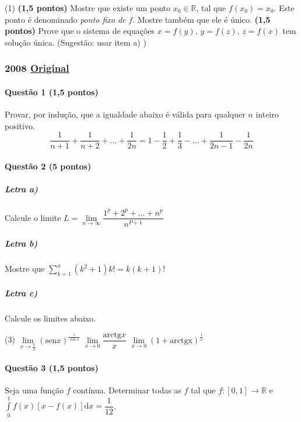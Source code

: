 \documentclass[12pt,a4paper]{article}
\newcommand{\R}{\mathbb{R}}
\newcommand{\original}[1]{\tiny \href{#1}{Original} \normalsize}
\begin{document}
\begin{tasks}(1)
\task \textbf{(1,5 pontos)} Mostre que existe um ponto $x_0 \in \R$, tal que $f(x_0) = x_0$. Este ponto é denominado \textit{ponto fixo de }$f$. Mostre também que ele é único.
\task \textbf{(1,5 pontos)} Prove que o sistema de equações $x=f(y), \,y=f(z),\,z=f(x)$ tem solução única. (Sugestão: usar item a) )
\end{tasks}

\newpage

\subsubsection{2008  \original{https://drive.google.com/open?id=1lLryQY20lhsav0_b_KpqDdEhK8T-ZmI7}}

\paragraph{Questão 1 (1,5 pontos)}

Provar, por indução, que a igualdade abaixo é válida para qualquer $n$ inteiro positivo.$$\dfrac{1}{n+1} +\dfrac{1}{n+2} +\dots+\dfrac{1}{2n} = 1 - \dfrac{1}{2} + \dfrac{1}{3} - \dots + \dfrac{1}{2n-1}-\dfrac{1}{2n}$$

\paragraph{Questão 2 (5 pontos)}

\subparagraph{Letra a)} Calcule o limite $L = \lim\limits_{n\to \infty} \dfrac{1^p + 2^p + \dots + n^p}{n^{P+1}}$
\subparagraph{Letra b)} Mostre que $\sum\limits_{k=1}^{n} (k^2+1)k! = k(k+1)!$
\subparagraph{Letra c)} Calcule os limites abaixo.
    \begin{tasks}[counter-format={(tsk[r])}](3)
    \task $\lim\limits_{x \to \frac{\pi}{2}} (\mathrm{sen}x)^{\frac{1}{\cos x}}$
    \task $\lim\limits_{x \to 0} \dfrac{\mathrm{arctg}x}{x}$
    \task $\lim\limits_{x\to 0}(1+\mathrm{arctg x})^{\frac{1}{x}}$
    \end{tasks}


\paragraph{Questão 3 (1,5 pontos)}

Seja uma função $f$ contínua. Determinar todas as $f$ tal que $f: [0,1] \to \R$ e $\int\limits_{0}^{1} f(x)[x - f(x)] \mathrm{d}x = \dfrac{1}{12}$.
\end{document}
